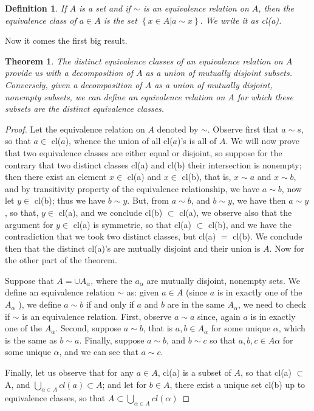 \documentclass[11pt,a4paper]{article}
\newtheorem{define}{Definition}
\newtheorem{thm}{Theorem}
\begin{document}
\begin{define}
	If $A$ is a set and if $\sim$ is an equivalence relation on $A$, then the equivalence class of $a \in A$ is the set $ \left\lbrace x \in A \vert a \sim x \right\rbrace.$ We write it as cl(a).
\end{define}

Now it comes the first big result.
\begin{thm}
	The distinct equivalence classes of an equivalence relation on $A$ provide us with a decomposition of $A$ as a union of mutually disjoint subsets. Conversely, given a decomposition of $A$ as a union of mutually disjoint, nonempty subsets, we can define an equivalence relation on $A$ for which these subsets are the distinct equivalence classes.
\end{thm}

\begin{proof}
	Let the equivalence relation on $A$ denoted by $ \sim $. Observe first that $ a \sim s$, so that $ a \in $ cl($a$), whence the union of all cl($a$)'s is all of $A$. We will now prove that two equivalence classes are either equal or disjoint, so suppose for the contrary that two distinct classes cl(a) and cl(b) their intersection is nonempty; then there exist an element $ x \in $ cl(a) and $ x \in $ cl(b), that is, $ x \sim a$ and $ x \sim b$, and by transitivity property of the equivalence relationship, we have $ a \sim b$, now let $ y \in $ cl(b); thus we have $ b \sim y$. But, from $ a \sim b$, and $ b \sim y$, we have then $ a \sim y$, so that, $ y \in $ cl(a), and we conclude cl(b) $ \subset$ cl(a), we observe also that the argument for $ y \in $ cl(a) is symmetric, so that cl(a) $ \subset$ cl(b), and we have the contradiction that we took two distinct classes, but cl(a) $=$ cl(b). We conclude then that the distinct cl(a)'s are mutually disjoint and their union is $A$. Now for the other part of the theorem. \par
	Suppose that $ A = \cup A_{\alpha} $, where the $a_{\alpha} $ are mutually disjoint, nonempty sets. We define an equivalence relation $ \sim $ as: given $a \in A$ (since $a$ is in exactly one of the $A_{\alpha}$ ), we define $a \sim b$ if and only if $a$ and $b$ are in the same $A_{\alpha}$, we need to check if $ \sim $ is an equivalence relation. First, observe $ a \sim a$ since, again $a$ is in exactly one of the $A_{\alpha}$. Second, suppose $ a \sim b$, that is $a,b \in A_{\alpha}$ for some unique $ \alpha $, which is the same as $ b \sim a$. Finally, suppose $a \sim b$, and $ b \sim c$ so that $a,b,c \in A{\alpha}$ for some unique $\alpha$, and we can see that $a \sim c$. \par 
	Finally, let us observe that for any $a \in A$, cl(a) is a subset of $A$, so that cl(a) $\subset$ A, and $\bigcup_{\alpha \in A} cl(a) \subset A$; and let for $b \in A$, there exist a unique set cl(b) up to equivalence classes, so that $ A \subset \bigcup_{\alpha \in A} cl(\alpha) $ 
\end{proof}
\end{document}
